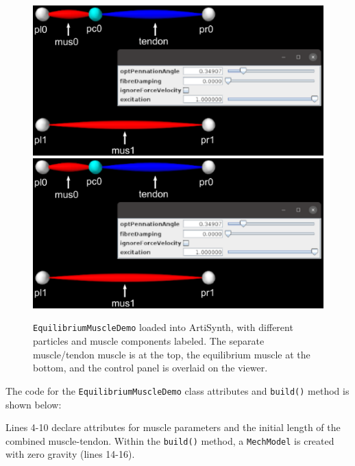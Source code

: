\begin{figure}[ht]
\begin{center}
\iflatexml
 \includegraphics[]{images/EquilibriumMuscleDemo}
\else
 \includegraphics[width=6in]{images/EquilibriumMuscleDemo}
\fi
\end{center}
\caption{{\tt EquilibriumMuscleDemo} loaded into ArtiSynth,
with different particles and muscle components labeled. The separate
muscle/tendon muscle is at the top, the equilibrium muscle at the
bottom, and the control panel is overlaid on the viewer.}
\label{EquilibriumMuscleDemo:fig}
\end{figure}

The code for the {\tt EquilibriumMuscleDemo} class attributes and
{\tt build()} method is shown below:
%
\lstset{numbers=left} 
\iflatexml

\else

\fi
\lstset{numbers=none}
%
Lines 4-10 declare attributes for muscle parameters and the initial
length of the combined muscle-tendon. Within the {\tt build()} method,
a {\tt MechModel} is created with zero gravity (lines 14-16).  

